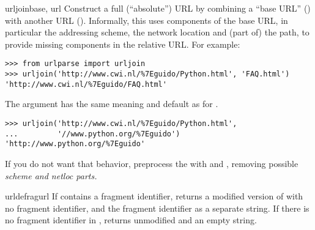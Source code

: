 \begin{funcdesc}{urljoin}{base, url}
Construct a full (``absolute'') URL by combining a ``base URL''
() with another URL ().  Informally, this
uses components of the base URL, in particular the addressing scheme,
the network location and (part of) the path, to provide missing
components in the relative URL.  For example:

\begin{verbatim}
>>> from urlparse import urljoin
>>> urljoin('http://www.cwi.nl/%7Eguido/Python.html', 'FAQ.html')
'http://www.cwi.nl/%7Eguido/FAQ.html'
\end{verbatim}

The  argument has the same meaning and default as
for .


\begin{verbatim}
>>> urljoin('http://www.cwi.nl/%7Eguido/Python.html',
...         '//www.python.org/%7Eguido')
'http://www.python.org/%7Eguido'
\end{verbatim}
      
If you do not want that behavior, preprocess
the  with  and ,
removing possible \em{scheme} and \em{netloc} parts.
\end{funcdesc}

\begin{funcdesc}{urldefrag}{url}
If  contains a fragment identifier, returns a modified
version of  with no fragment identifier, and the fragment
identifier as a separate string.  If there is no fragment identifier
in , returns  unmodified and an empty string.
\end{funcdesc}


\begin{seealso}
\end{seealso}


